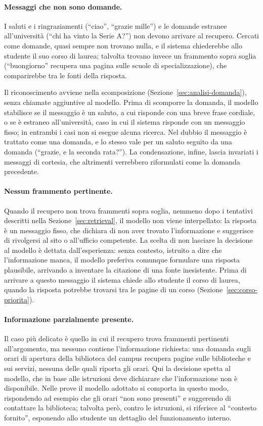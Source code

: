 \paragraph{Messaggi che non sono domande.} I saluti e i ringraziamenti (``ciao'', ``grazie mille'') e le domande
estranee all'università (``chi ha vinto la Serie A?'') non devono arrivare al recupero. Cercati come domande, quasi
sempre non trovano nulla, e il sistema chiederebbe allo studente il suo corso di laurea; talvolta trovano invece un
frammento sopra soglia (``buongiorno'' recupera una pagina sulle scuole di specializzazione), che comparirebbe tra
le fonti della risposta.

Il riconoscimento avviene nella scomposizione (Sezione~\ref{sec:analisi-domanda}), senza chiamate aggiuntive al
modello. Prima di scomporre la domanda, il modello stabilisce se il messaggio è un saluto, a cui risponde con una
breve frase cordiale, o se è estraneo all'università, caso in cui il sistema risponde con un messaggio fisso; in
entrambi i casi non si esegue alcuna ricerca. Nel dubbio il messaggio è trattato come una domanda, e lo stesso vale
per un saluto seguito da una domanda (``grazie, e la seconda rata?''). La condensazione, infine, lascia invariati i
messaggi di cortesia, che altrimenti verrebbero riformulati come la domanda precedente.

\paragraph{Nessun frammento pertinente.} Quando il recupero non trova frammenti sopra soglia, nemmeno dopo i
tentativi descritti nella Sezione~\ref{sec:retrieval}, il modello non viene interpellato: la risposta è un messaggio
fisso, che dichiara di non aver trovato l'informazione e suggerisce di rivolgersi al sito o all'ufficio competente.
La scelta di non lasciare la decisione al modello è dettata dall'esperienza: senza contesto, istruito a dire che
l'informazione manca, il modello preferiva comunque formulare una risposta plausibile, arrivando a inventare la
citazione di una fonte inesistente. Prima di arrivare a questo messaggio il sistema chiede allo studente il corso
di laurea, quando la risposta potrebbe trovarsi tra le pagine di un corso (Sezione~\ref{sec:corso-priorita}).

\paragraph{Informazione parzialmente presente.} Il caso più delicato è quello in cui il recupero trova frammenti
pertinenti all'argomento, ma nessuno contiene l'informazione richiesta: una domanda sugli orari di apertura della
biblioteca del campus recupera pagine sulle biblioteche e sui servizi, nessuna delle quali riporta gli orari. Qui la
decisione spetta al modello, che in base alle istruzioni deve dichiarare che l'informazione non è disponibile.
Nelle prove il modello adottato si comporta in questo modo, rispondendo ad esempio che gli orari ``non sono
presenti'' e suggerendo di contattare la biblioteca; talvolta però, contro le istruzioni, si riferisce al
``contesto fornito'', esponendo allo studente un dettaglio del funzionamento interno.
